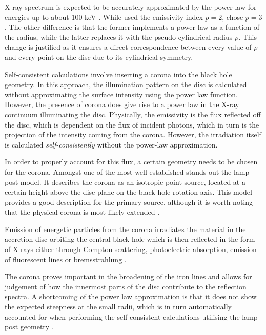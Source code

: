 \documentclass[fleqn,usenatbib,useAMS]{mnras}
\begin{document}
X-ray spectrum is expected to be accurately approximated by the power law for energies up to about 100 keV \citep{brenneman2006constraining}. While \cite{fanton1997detecting} used the emissivity index $p = 2$, \cite{abdikamalov2020testing} chose $p = 3$. The other difference is that the former implements a power law as a function of the radius, while the latter replaces it with the pseudo-cylindrical radius $\rho$. This change is justified as it ensures a direct correspondence between every value of $\rho$ and every point on the disc due to its cylindrical symmetry. 

Self-consistent calculations involve inserting a corona into the black hole geometry. In this approach, the illumination pattern on the disc is calculated without approximating the surface intensity using the power law function. However, the presence of corona does give rise to a power law in the X-ray continuum illuminating the disc. Physically, the emissivity is the flux reflected off the disc, which is dependent on the flux of incident photons, which in turn is the projection of the intensity coming from the corona. However, the irradiation itself is calculated \textit{self-consistently} without the power-law approximation.

In order to properly account for this flux, a certain geometry needs to be chosen for the corona. Amongst one of the most well-established stands out the lamp post model. It describes the corona as an isotropic point source, located at a certain height above the disc plane on the black hole rotation axis. This model provides a good description for the primary source, although it is worth noting that the physical corona is most likely extended \citep{wilkins2015driving}. 

Emission of energetic particles from the corona irradiates the material in the accretion disc orbiting the central black hole \citep{george1991x} which is then reflected in the form of X-rays either through Compton scattering, photoelectric absorption, emission of fluorescent lines or bremsstrahlung \citep{ross2005comprehensive}.

The corona proves important in the broadening of the iron lines and allows for judgement of how the innermost parts of the disc contribute to the reflection spectra. A shortcoming of the power law approximation is that it does not show the expected steepness at the small radii, which is in turn automatically accounted for when performing the self-consistent calculations utilising the lamp post geometry \citep{dauser2016relativistic}. 
\end{document}
